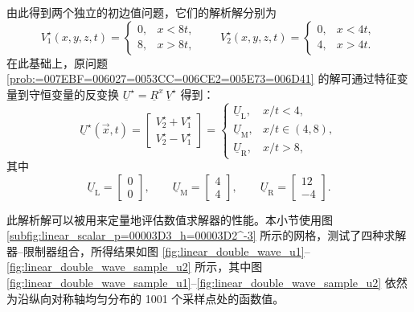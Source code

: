 由此得到两个独立的初边值问题，它们的解析解分别为
\begin{equation}
V_{1}^{\star}(x,y,z,t)=\begin{cases}
0, & x<8t,\\
8, & x>8t,
\end{cases}\qquad V_{2}^{\star}(x,y,z,t)=\begin{cases}
0, & x<4t,\\
4, & x>4t.
\end{cases}
\end{equation}
在此基础上，原问题 \ref{prob:=007EBF=006027=0053CC=006CE2=005E73=006D41} 的解可通过特征变量到守恒变量的反变换
$\underline{U}^{\star}=\underline{R}^{x}\,\underline{V}^{\star}$
得到：
\begin{equation}
\underline{U}^{\star}(\vec{x},t)=\begin{bmatrix}V_{2}^{\star}+V_{1}^{\star}\\
V_{2}^{\star}-V_{1}^{\star}
\end{bmatrix}=\begin{cases}
\underline{U}_{\mathrm{L}}, & x/t<4,\\
\underline{U}_{\mathrm{M}}, & x/t\in(4,8),\\
\underline{U}_{\mathrm{R}}, & x/t>8,
\end{cases}\label{eq:linear_double_wave_solution}
\end{equation}
其中
\begin{equation}
\underline{U}_{\mathrm{L}}=\begin{bmatrix}0\\
0
\end{bmatrix},\qquad\underline{U}_{\mathrm{M}}=\begin{bmatrix}4\\
4
\end{bmatrix},\qquad\underline{U}_{\mathrm{R}}=\begin{bmatrix}12\\
-4
\end{bmatrix}.
\end{equation}

此解析解可以被用来定量地评估数值求解器的性能。本小节使用图 \ref{subfig:linear_scalar_p=00003D3_h=00003D2^-3}
所示的网格，测试了四种求解器–限制器组合，所得结果如图 \ref{fig:linear_double_wave_u1}–\ref{fig:linear_double_wave_sample_u2}
所示，其中图 \ref{fig:linear_double_wave_sample_u1}–\ref{fig:linear_double_wave_sample_u2}
依然为沿纵向对称轴均匀分布的 1001 个采样点处的函数值。

